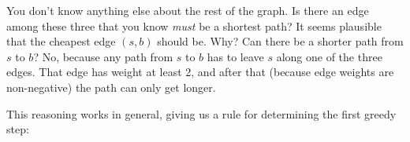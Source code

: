 \begin{center}
\end{center}

You don't know anything else about the rest of the graph.
Is there an edge among these three that you know \emph{must} be a shortest path?
It seems plausible that the cheapest edge $(s, b)$ should be.  Why?
Can there be a shorter path from $s$ to $b$?
No, because any path from $s$ to $b$ has to leave $s$
along one of the three edges.
That edge has weight at least 2, and after that (because edge weights are non-negative)
the path can only get longer.

This reasoning works in general, giving us a rule for determining the first greedy step:

